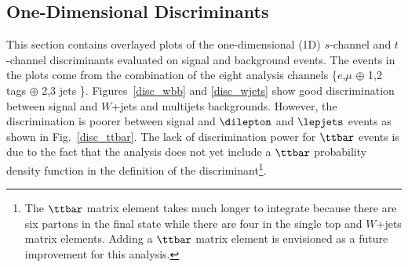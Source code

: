  
\subsection{One-Dimensional Discriminants}

This section contains overlayed plots of the one-dimensional (1D) $s$-channel
and $t$-channel discriminants evaluated on signal and background events. The events in
the plots come from the combination of the eight analysis channels \{$e$,$\mu$ $\oplus$ 1,2 tags $\oplus$ 2,3 jets \}. Figures~\ref{disc_wbb} and \ref{disc_wjets} show good
discrimination between signal and $W$+jets and multijets backgrounds.
However, the discrimination is poorer between signal and $\dilepton$
and $\lepjets$ events as shown in Fig.~\ref{disc_ttbar}. The lack of
discrimination power for $\ttbar$ events is due to the fact that the analysis does not yet include a $\ttbar$
probability density function in the definition of the discriminant\footnote{The $\ttbar$ matrix element takes much longer to integrate because
there are six partons in the final state while there are four in the
single top and $W$+jets matrix elements. Adding a $\ttbar$ matrix
element is envisioned as a future improvement for this analysis.}.

